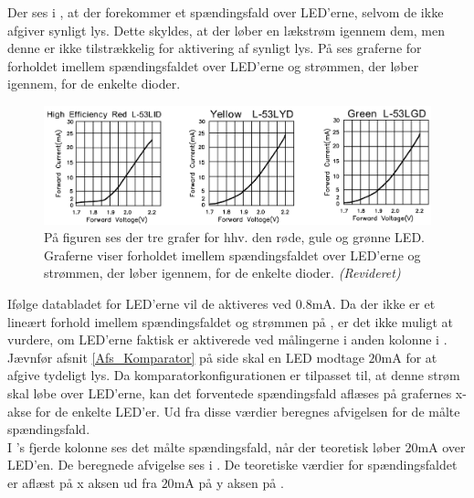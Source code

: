 \noindent Der ses i , at der forekommer et spændingsfald over LED'erne, selvom de ikke afgiver synligt lys. Dette skyldes, at der løber en lækstrøm igennem dem, men denne er ikke tilstrækkelig for aktivering af synligt lys. På  ses graferne for forholdet imellem spændingsfaldet over LED'erne og strømmen, der løber igennem, for de enkelte dioder. \cite{Kingbright}
\begin{figure}[H]
	\centering
	\includegraphics[scale=.45]{figures/cProblemloesning/Samlet_system_LED.PNG}
	\caption{På figuren ses der tre grafer for hhv. den røde, gule og grønne LED. Graferne viser forholdet imellem spændingsfaldet over LED'erne og strømmen, der løber igennem, for de enkelte dioder. \textit{(Revideret)} \cite{Kingbright}}
	\label{fig:samlet_system_LED}
\end{figure}
\noindent Ifølge databladet for LED'erne vil de aktiveres ved $0.8$mA. Da der ikke er et lineært forhold imellem spændingsfaldet og strømmen på , er det ikke muligt at vurdere, om LED'erne faktisk er aktiverede ved målingerne i anden kolonne i . Jævnfør afsnit \ref{Afs_Komparator} på side \pageref{Afs_Komparator} skal en LED modtage $20$mA for at afgive tydeligt lys. Da komparatorkonfigurationen er tilpasset til, at denne strøm skal løbe over LED'erne, kan det forventede spændingsfald aflæses på grafernes x-akse for de enkelte LED'er. Ud fra disse værdier beregnes afvigelsen for de målte spændingsfald. \\
I 's fjerde kolonne ses det målte spændingsfald, når der teoretisk løber $20$mA over LED'en. De beregnede afvigelse ses i . De teoretiske værdier for spændingsfaldet er aflæst på x aksen ud fra $20$mA på y aksen på .
